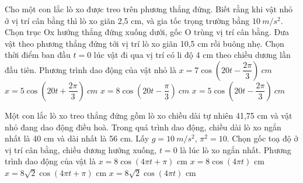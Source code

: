 \begin{ex}%
Cho một con lắc lò xo được treo trên phương thẳng đứng. Biết rằng khi vật nhỏ ở vị trí cân bằng thì lò xo giãn 2,5 cm, và gia tốc trọng trường bằng $10\ m/s^2$. Chọn trục Ox hướng thẳng đứng xuống dưới, gốc O trùng vị trí cân bằng. Đưa vật theo phương thẳng đứng tới vị trí lò xo giãn 10,5 cm rồi buông nhẹ. Chọn thời điểm ban đầu $t = 0$ lúc vật đi qua vị trí có li độ 4 cm theo chiều dương lần đầu tiên. Phương trình dao động của vật nhỏ là
\choice
{$x=7\cos\left(20t - \dfrac{2\pi}{3}\right)\ cm$}
{$x=5\cos\left(20t + \dfrac{2\pi}{3}\right)\ cm$}
{\True $x=8\cos\left(20t - \dfrac{\pi}{3}\right)\ cm$}
{$x=5\cos\left(20t-\dfrac{2\pi}{3}\right)\ cm$}
\end{ex} 
\begin{ex}%
Một con lắc lò xo treo thẳng đứng gồm lò xo chiều dài tự nhiên 41,75 cm và vật nhỏ đang dao động điều hoà. Trong quá trình dao động, chiều dài lò xo ngắn nhất là 40 cm và dài nhất là 56 cm. Lấy $g = 10\ m/s^2$, $\pi^2 = 10$. Chọn gốc toạ độ ở vị trí cân bằng, chiều dương hướng xuống, $t = 0$ là lúc lò xo ngắn nhất. Phương trình dao động của vật là
\choice
{\True $x=8\cos  \left( 4\pi t+\pi\right)$ cm}
{$x=8\cos  \left( 4\pi t \right)$ cm}
{$x=8\sqrt{2}\cos  \left( 4\pi t+\pi\right)$ cm}
{$x=8\sqrt{2}\cos  \left( 4\pi t \right)$ cm}
\end{ex} 
